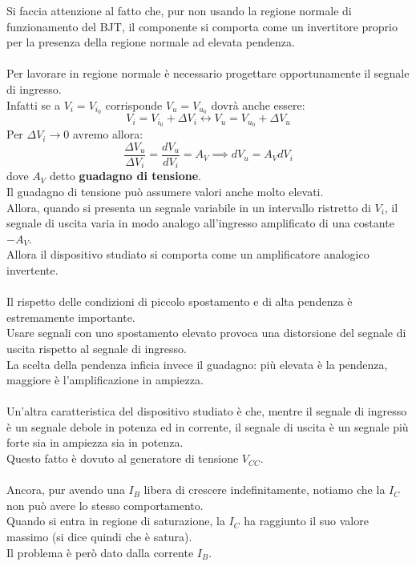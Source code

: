 \documentclass{article}
\numberwithin{equation}{subsection}
\begin{document}
	Si faccia attenzione al fatto che, pur non usando la regione normale di funzionamento del BJT, il componente si comporta come un invertitore proprio per la presenza della regione normale ad elevata pendenza.\\\\
	Per lavorare in regione normale è necessario progettare opportunamente il segnale di ingresso. \\
	Infatti se a $V_i = V_{i_0}$ corrisponde $V_u = V_{u_0}$ dovrà anche essere:
	$$V_i = V_{i_0} + \Delta V_i \longleftrightarrow V_u = V_{u_0} + \Delta V_u$$
	Per $\Delta V_i \rightarrow 0$ avremo allora:
	$$\frac{\Delta V_u}{\Delta V_i} = \frac{dV_u}{dV_i} = A_V \implies dV_u = A_V dV_i$$
	dove $A_V$ detto \textbf{guadagno di tensione}. \\
	Il guadagno di tensione può assumere valori anche molto elevati. \\
	Allora, quando si presenta un segnale variabile in un intervallo ristretto di $V_i$, il segnale di uscita varia in modo analogo all’ingresso amplificato di una costante $-A_V$. \\
	Allora il dispositivo studiato si comporta come un amplificatore analogico invertente.\\\\
	Il rispetto delle condizioni di piccolo spostamento e di alta pendenza è estremamente importante. \\
	Usare segnali con uno spostamento elevato provoca una distorsione del segnale di uscita rispetto al segnale di ingresso. \\
	La scelta della pendenza inficia invece il guadagno: più elevata è la pendenza, maggiore è l’amplificazione in ampiezza.\\\\
	Un’altra caratteristica del dispositivo studiato è che, mentre il segnale di ingresso è un segnale debole in potenza ed in corrente, il segnale di uscita è un segnale più forte sia in ampiezza sia in potenza. \\
	Questo fatto è dovuto al generatore di tensione $V_{CC}$.\\\\
	Ancora, pur avendo una $I_B$ libera di crescere indefinitamente, notiamo che la $I_C$ non può avere lo stesso comportamento. \\
	Quando si entra in regione di saturazione, la $I_C$ ha raggiunto il suo valore massimo (si dice quindi che è satura). \\
	Il problema è però dato dalla corrente $I_B$. \\
\end{document}
